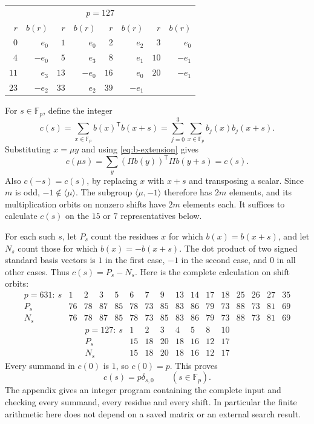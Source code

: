 \documentclass[10pt]{article}
\newcommand{\F}{\mathbb F}
\begin{document}
\begin{center}\small
\begin{tabular}{rr@{\quad}rr@{\quad}rr@{\quad}rr}
\multicolumn{8}{c}{$p=127$}\\
$r$&$b(r)$&$r$&$b(r)$&$r$&$b(r)$&$r$&$b(r)$\\\hline
$0$&$e_{0}$&$1$&$e_{0}$&$2$&$e_{2}$&$3$&$e_{0}$\\
$4$&$-e_{0}$&$5$&$e_{3}$&$8$&$e_{1}$&$10$&$-e_{1}$\\
$11$&$e_{3}$&$13$&$-e_{0}$&$16$&$e_{0}$&$20$&$-e_{1}$\\
$23$&$-e_{2}$&$33$&$e_{2}$&$39$&$-e_{1}$&&\\
\end{tabular}\end{center}

For $s\in\F_p$, define the integer
\begin{equation}\label{eq:c-def}
 c(s)=\sum_{x\in\F_p} b(x)^{\mathsf T}b(x+s)
     =\sum_{j=0}^3\sum_{x\in\F_p}b_j(x)b_j(x+s).
\end{equation}
Substituting $x=\mu y$ and using \eqref{eq:b-extension} gives
\[
 c(\mu s)=\sum_y (\Pi b(y))^{\mathsf T}\Pi b(y+s)=c(s).
\]
Also $c(-s)=c(s)$, by replacing $x$ with $x+s$ and transposing a scalar.
Since $m$ is odd, $-1\notin\langle\mu\rangle$. The subgroup
$\langle\mu,-1\rangle$ therefore has $2m$ elements, and its multiplication
orbits on nonzero shifts have $2m$ elements each.
It suffices to calculate $c(s)$ on the $15$ or $7$ representatives below.

For each such $s$, let $P_s$ count the residues $x$ for which
$b(x)=b(x+s)$, and let $N_s$ count those for which $b(x)=-b(x+s)$.
The dot product of two signed standard basis vectors is $1$ in the first
case, $-1$ in the second case, and $0$ in all other cases.
Thus $c(s)=P_s-N_s$. Here is the complete calculation on shift orbits:
\[
\begin{array}{c|rrrrrrrrrrrrrrr}
p=631:\ s&1&2&3&5&6&7&9&13&14&17&18&25&26&27&35\\\hline
P_s&76&78&87&85&78&73&85&83&86&79&73&88&73&81&69\\
N_s&76&78&87&85&78&73&85&83&86&79&73&88&73&81&69
\end{array}
\]
\[
\begin{array}{c|rrrrrrr}
p=127:\ s&1&2&3&4&5&8&10\\\hline
P_s&15&18&20&18&16&12&17\\
N_s&15&18&20&18&16&12&17
\end{array}
\]
Every summand in $c(0)$ is $1$, so $c(0)=p$. This proves
\begin{equation}\label{eq:T}
 c(s)=p\delta_{s,0}\qquad(s\in\F_p).
\end{equation}
The appendix gives an integer program containing the complete input and
checking every summand, every residue and every shift. In particular the
finite arithmetic here does not depend on a saved matrix or an external
search result.
\end{document}
